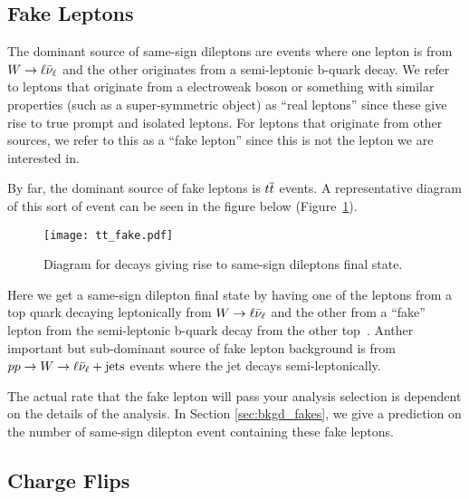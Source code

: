 \subsection{Fake Leptons}
\label{sec:ss_bkgd_fakes}

The dominant source of same-sign dileptons are events where one lepton is from
$\relax{W} \to \ell\bar{\nu}_{\ell}$ and the other originates from a semi-leptonic b-quark decay. We refer
to leptons that originate from a electroweak boson or something with similar
properties (such as a super-symmetric object) as ``real leptons'' since these
give rise to true prompt and isolated leptons. For leptons that originate from
other sources, we refer to this as a ``fake lepton'' since this is not the
lepton we are interested in.

By far, the dominant source of fake leptons is $\relax{t}\overline{\relax{t}}$ events. A
representative diagram of this sort of event can be seen in the figure below
(Figure~\ref{fig:feyn_ttbar_fakes}).
\begin{figure}[tbhp]
\begin{center}
\texttt{[image: tt\_fake.pdf]}
\caption[Feynman diagram for fakes from \ttbar]
{\label{fig:feyn_ttbar_fakes} 
Diagram for \ttbar decays giving rise to same-sign dileptons final state.
}
\end{center}
\end{figure}
Here we get a same-sign dilepton final state by having one of the leptons
from a top quark decaying leptonically from $\relax{W} \to \ell\bar{\nu}_{\ell}$ and the other from
a ``fake'' lepton from the semi-leptonic b-quark decay from the other
top~\cite{an_ssb2011}. Anther important but sub-dominant source of fake lepton
background is from $pp \to \relax{W} \to \ell\bar{\nu}_{\ell} + \text{jets}$ events where the jet decays
semi-leptonically.

The actual rate that the fake lepton will pass your analysis selection is
dependent on the details of the analysis. In Section \ref{sec:bkgd_fakes}, we
give a prediction on the number of same-sign dilepton event containing these
fake leptons.

\subsection{Charge Flips}
\label{sec:ss_bkgd_flips}

